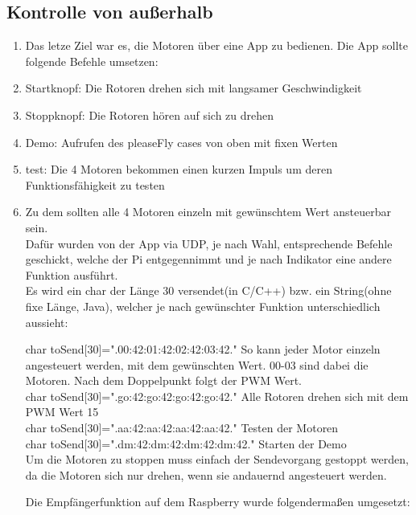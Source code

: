 \documentclass{article}
\begin{document}
\subsection{Kontrolle von außerhalb}

\begin{enumerate}
\item[]Das letze Ziel war es, die Motoren über eine App zu bedienen. Die App sollte folgende Befehle umsetzen:\\
\item Startknopf: Die Rotoren drehen sich mit langsamer Geschwindigkeit
\item Stoppknopf: Die Rotoren hören auf sich zu drehen
\item Demo:	Aufrufen des pleaseFly cases von oben mit fixen Werten
\item test: Die 4 Motoren bekommen einen kurzen Impuls um deren Funktionsfähigkeit zu testen
\item[] Zu dem sollten alle 4 Motoren einzeln mit gewünschtem Wert ansteuerbar sein.\\

Dafür wurden von der App via UDP, je nach Wahl, entsprechende Befehle geschickt, welche der Pi entgegennimmt und je nach Indikator eine andere Funktion ausführt.\\

Es wird ein char der Länge 30 versendet(in C/C++) bzw. ein String(ohne fixe Länge, Java), welcher je nach gewünschter Funktion unterschiedlich aussieht:

char toSend[30]=".00:42:01:42:02:42:03:42." So kann jeder Motor einzeln angesteuert werden, mit dem gewünschten Wert. 00-03 sind dabei die Motoren. Nach dem Doppelpunkt folgt der PWM Wert.\\

char toSend[30]=".go:42:go:42:go:42:go:42." Alle Rotoren drehen sich mit dem PWM Wert 15\\

char toSend[30]=".aa:42:aa:42:aa:42:aa:42." Testen der Motoren\\

char toSend[30]=".dm:42:dm:42:dm:42:dm:42." Starten der Demo\\

Um die Motoren zu stoppen muss einfach der Sendevorgang gestoppt werden, da die Motoren sich nur drehen, wenn sie andauernd angesteuert werden.

Die Empfängerfunktion auf dem Raspberry wurde folgendermaßen umgesetzt:\\


\end{enumerate}
\end{document}
